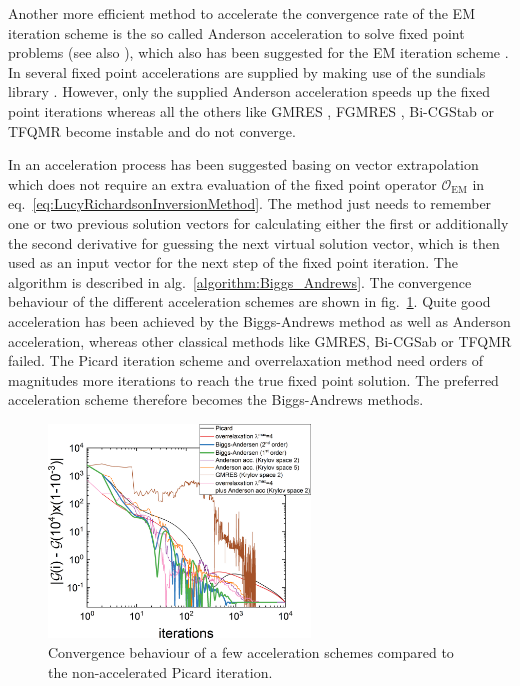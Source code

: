 Another more efficient method to accelerate the convergence rate of the EM iteration scheme is the so called Anderson acceleration \cite{Anderson1965} to solve fixed point problems (see also \cite{Walker2011,Toth2015}), which also has been suggested for the EM iteration scheme \cite{Henderson2019}. In \SASfit several fixed point accelerations are supplied by making use of the sundials library \cite{Hindmarsh2005}. However, only the supplied Anderson acceleration speeds up the fixed point iterations whereas all the others like GMRES \cite{Saad1986}, FGMRES \cite{Saad1993}, Bi-CGStab \cite{Vorst1992} or TFQMR \cite{Freund1993} become instable and do not converge.

In \cite{Biggs1997, Biggs1995, Biggs1998, Wang2014,Jiang2017} an acceleration process has been suggested basing on vector extrapolation which does not require an extra evaluation of the fixed point operator $\mathcal{O}_\mathrm{EM}$ in eq.\ \ref{eq:LucyRichardsonInversionMethod}. The method just needs to remember one or two previous solution vectors for calculating either the first or additionally the second derivative for guessing the next virtual solution vector, which is then used as an input vector for the next step of the fixed point iteration. The algorithm is described in alg.\ \ref{algorithm:Biggs_Andrews}. The convergence behaviour of the different acceleration schemes are shown in fig.\ \ref{fig:EMconvergenceSpeed}. Quite good acceleration has been achieved by the Biggs-Andrews method as well as Anderson acceleration, whereas other classical methods like GMRES, Bi-CGSab or TFQMR failed. The Picard iteration scheme and  overrelaxation method need orders of magnitudes more iterations to reach the true fixed point solution. The preferred acceleration scheme therefore becomes the Biggs-Andrews methods.


\begin{figure}[htb]
\centering
\includegraphics[width=0.62\textwidth]{../images/form_factor/EM/EMconvergenceSpeed.png}
\caption{Convergence behaviour of a few acceleration schemes compared to the non-accelerated Picard iteration.\label{fig:EMconvergenceSpeed}}
\end{figure}

